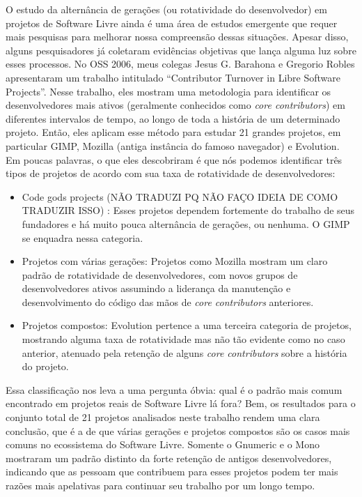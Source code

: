O estudo da alternância de gerações (ou rotatividade do desenvolvedor) em projetos de Software Livre
ainda é uma área de estudos emergente que requer mais pesquisas para melhorar nossa
compreensão dessas situações. Apesar disso, alguns pesquisadores já coletaram evidências
objetivas que lança alguma luz sobre esses processos.
No OSS 2006, meus colegas Jesus G. Barahona e Gregorio Robles apresentaram um trabalho
intitulado ``Contributor Turnover in Libre Software Projects''. Nesse trabalho,
eles mostram uma metodologia para identificar os desenvolvedores mais ativos (geralmente conhecidos
como \textit {core contributors}) em diferentes intervalos de tempo, ao longo de toda a história
de um determinado projeto. Então, eles aplicam esse método para estudar 21 grandes projetos, em
particular GIMP, Mozilla (antiga instância do famoso navegador) e
Evolution. Em poucas palavras, o que eles descobriram é que nós podemos identificar três tipos de
projetos de acordo com sua taxa de rotatividade de desenvolvedores:
\begin{itemize}
 \item Code gods projects (NÃO TRADUZI PQ NÃO FAÇO IDEIA DE COMO TRADUZIR ISSO)
: Esses projetos dependem fortemente do trabalho de seus 
fundadores e há muito pouca alternância de gerações, ou nenhuma. O GIMP se
enquadra nessa categoria.
 \item Projetos com várias gerações: Projetos como Mozilla mostram um claro
padrão de rotatividade de desenvolvedores, com novos grupos de desenvolvedores
ativos assumindo a liderança da manutenção e desenvolvimento do código das mãos
de \textit {core contributors} anteriores.
 \item Projetos compostos: Evolution pertence a uma terceira categoria de projetos,
mostrando alguma taxa de rotatividade mas não tão evidente como no caso anterior,
atenuado pela retenção de alguns \textit {core contributors} sobre a história do
projeto.
\end{itemize}

Essa classificação nos leva a uma pergunta óbvia: qual é o padrão mais
comum encontrado em projetos reais de Software Livre lá fora? Bem, os resultados
para o conjunto total de 21 projetos analisados neste trabalho rendem uma clara conclusão,
que é a de que várias gerações e projetos compostos são os casos mais comuns no ecossistema
do Software Livre. Somente o Gnumeric e o Mono mostraram um padrão distinto da forte retenção
de antigos desenvolvedores, indicando que as pessoam que contribuem para esses projetos podem 
ter mais razões mais apelativas para continuar seu trabalho por um longo tempo.

